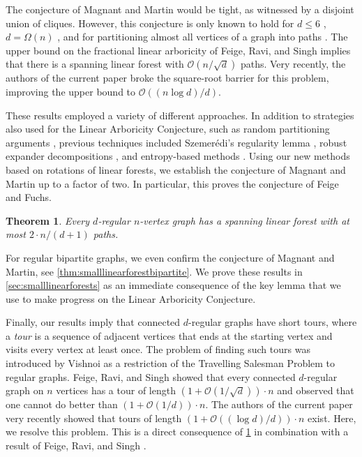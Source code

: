 \documentclass[11pt]{article}
\theoremstyle{plain}
\newtheorem{theorem}{Theorem}[section]
\theoremstyle{definition}
\newcommand{\cO}{\mathcal O}
\begin{document}
The conjecture of Magnant and Martin would be tight, as witnessed by a disjoint union of cliques. However, this conjecture is only known to hold for $d \le 6$ \cite{magnant2009note,feige2022path}, $d = \Omega(n)$ \cite{han2018vertex,gruslys2021cycle}, and for partitioning almost all vertices of a graph into paths \cite{montgomery2024approximate,letzter2025nearly}. The upper bound on the fractional linear arboricity of Feige, Ravi, and Singh \cite{feige2014short} implies that there is a spanning linear forest with $\cO(n/\sqrt{d})$ paths. Very recently, the authors of the current paper \cite{christoph2025cyclefactors} broke the square-root barrier for this problem, improving the upper bound to $\cO((n\log d)/d)$.

These results employed a variety of different approaches. In addition to strategies also used for the Linear Arboricity Conjecture, such as random partitioning arguments \cite{montgomery2024approximate}, previous techniques included Szemer\'edi's regularity lemma \cite{han2018vertex}, robust expander decompositions \cite{gruslys2021cycle,letzter2025nearly}, and entropy-based methods \cite{christoph2025cyclefactors}. Using our new methods based on rotations of linear forests, we establish the conjecture of Magnant and Martin up to a factor of two. In particular, this proves the conjecture of Feige and Fuchs.

\begin{theorem}\label{thm:smalllinearforest}
    Every $d$-regular $n$-vertex graph has a spanning linear forest with at most $2 \cdot n / (d+1)$ paths.
\end{theorem}

For regular bipartite graphs, we even confirm the conjecture of Magnant and Martin, see \cref{thm:smalllinearforestbipartite}. We prove these results in \cref{sec:smalllinearforests} as an immediate consequence of the key lemma that we use to make progress on the Linear Arboricity Conjecture.

Finally, our results imply that connected $d$-regular graphs have short tours, where a \emph{tour} is a sequence of adjacent vertices that ends at the starting vertex and visits every vertex at least once. The problem of finding such tours was introduced by Vishnoi \cite{vishnoi2012permanent} as a restriction of the Travelling Salesman Problem to regular graphs. Feige, Ravi, and Singh \cite{feige2014short} showed that every connected $d$-regular graph on $n$ vertices has a tour of length $(1+\cO(1/\sqrt{d})) \cdot n$ and observed that one cannot do better than $(1+\cO(1/d)) \cdot n$. The authors of the current paper \cite{christoph2025cyclefactors} very recently showed that tours of length $(1 + \cO((\log d)/d)) \cdot n$ exist. Here, we resolve this problem. This is a direct consequence of \cref{thm:smalllinearforest} in combination with a result of Feige, Ravi, and Singh \cite[Corollary 1]{feige2014short}.
\end{document}
